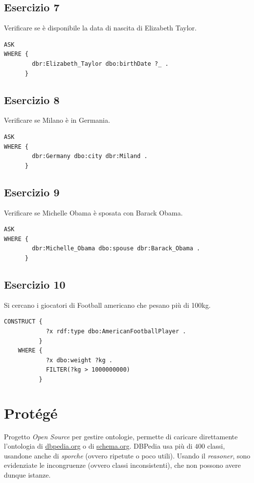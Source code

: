 \documentclass[11pt]{article}
\begin{document}
\subsection*{Esercizio 7}
Verificare se è disponibile la data di nascita di Elizabeth Taylor.
\begin{lstlisting}[language=sparql]
  ASK
WHERE {
        dbr:Elizabeth_Taylor dbo:birthDate ?_ .
      }
\end{lstlisting}

\subsection*{Esercizio 8}
Verificare se Milano è in Germania.
\begin{lstlisting}[language=sparql]
  ASK
WHERE {
        dbr:Germany dbo:city dbr:Miland .
      }
\end{lstlisting}

\subsection*{Esercizio 9}
Verificare se Michelle Obama è sposata con Barack Obama.
\begin{lstlisting}[language=sparql]
  ASK
WHERE {
        dbr:Michelle_Obama dbo:spouse dbr:Barack_Obama .
      }
\end{lstlisting}

\subsection*{Esercizio 10}
Si cercano i giocatori di Football americano che pesano più di 100kg.
\begin{lstlisting}[language=sparql]
CONSTRUCT {
            ?x rdf:type dbo:AmericanFootballPlayer .
          }
    WHERE {
            ?x dbo:weight ?kg .
            FILTER(?kg > 1000000000)
          }
\end{lstlisting}


\section{Protégé}
Progetto \textit{Open Source} per gestire ontologie, permette di caricare direttamente l'ontologia di \url{dbpedia.org} o di \url{schema.org}.
DBPedia usa più di $400$ classi, usandone anche di \textit{sporche} (ovvero ripetute o poco utili).
Usando il \textit{reasoner}, sono evidenziate le incongruenze (ovvero classi inconsistenti), che non possono avere dunque istanze.
\end{document}

